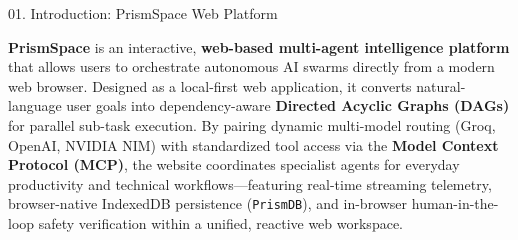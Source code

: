 \documentclass[aspectratio=169,10pt]{beamer}
\begin{document}
\begin{frame}[c]{01. Introduction: PrismSpace Web Platform}
\centering
\begin{minipage}{0.94\linewidth}
\begin{tcolorbox}[
  enhanced, arc=5pt, colframe=lavenderDark!80, colback=lavenderLight!25,
  boxrule=1.0pt,
  left=18pt, right=18pt, top=16pt, bottom=16pt
]
\fontsize{9.6}{14.6}\selectfont\sffamily\color{lavenderDeep}
    \textbf{\large\color{lavenderDark}PrismSpace} is an interactive, \textbf{web-based multi-agent intelligence platform} that allows users to orchestrate autonomous AI swarms directly from a modern web browser. Designed as a local-first web application, it converts natural-language user goals into dependency-aware \textbf{Directed Acyclic Graphs (DAGs)} for parallel sub-task execution. By pairing dynamic multi-model routing (Groq, OpenAI, NVIDIA NIM) with standardized tool access via the \textbf{Model Context Protocol (MCP)}, the website coordinates specialist agents for everyday productivity and technical workflows—featuring real-time streaming telemetry, browser-native IndexedDB persistence (\texttt{PrismDB}), and in-browser human-in-the-loop safety verification within a unified, reactive web workspace.
\end{tcolorbox}
\end{minipage}
\end{frame}
\end{document}
